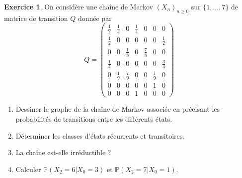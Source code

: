 \documentclass[10pt,fleqn, svgnames]{article}
\theoremstyle{definition}
\newtheorem{exo}{Exercice}
\begin{document}
\begin{exo}
	On considère une chaîne de Markov $(X_n)_{n\geq0}$ sur $\{1, \dots, 7\}$ de matrice de transition $Q$
donnée par
$$Q =
\begin{pmatrix}
\frac12 &\frac14 &0 &\frac14 &0 &0 &0 \\
\frac12 &0 &0 &0 &0 &0 &\frac12\\
0& 0 &\frac18 &0 &\frac78 &0 &0\\
\frac14 &0 &0 &0 &0 &0 &\frac34\\
0 &\frac19 &\frac79 &0 &0 &\frac19 &0\\
0 &0 &0 &0 &0 &1 &0\\
0 &0 &0 &1 &0 &0 &0\end{pmatrix}$$
\begin{enumerate}
\item Dessiner le graphe de la chaîne de Markov associée en précisant les probabilités de transitions
entre les différents états.
\item Déterminer les classes d’états récurrents et transitoires.
\item La chaîne est-elle irréductible ?
\item Calculer $\mathbb P(X_2 = 6\vert X_0 =3)$ et $\mathbb P(X_2 = 7\vert X_0 = 1)$.
\end{enumerate}
\end{exo}
\end{document}
